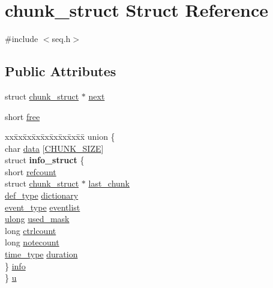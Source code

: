 \hypertarget{structchunk__struct}{}\section{chunk\+\_\+struct Struct Reference}
\label{structchunk__struct}


{\ttfamily \#include $<$seq.\+h$>$}

\subsection*{Public Attributes}
\begin{DoxyCompactItemize}
\item 
struct \hyperlink{structchunk__struct}{chunk\+\_\+struct} $\ast$ \hyperlink{structchunk__struct_a7cb05782775004328fdfa5f6846bfed9}{next}
\item 
short \hyperlink{structchunk__struct_a040378291dd24f6c361a846e7ad542ab}{free}
\item 
\begin{tabbing}
xx\=xx\=xx\=xx\=xx\=xx\=xx\=xx\=xx\=\kill
union \{\\
\>char \hyperlink{structchunk__struct_afd1e82a4b95631fc0bf56c308d017314}{data} \mbox{[}\hyperlink{seq_8h_aea3cfda4f3a9f978ec759f206cf186fe}{CHUNK\_SIZE}\mbox{]}\\
\>struct {\bfseries info\_struct} \{\\
\>\>short \hyperlink{structchunk__struct_a4163a53b7a225fb5f9e3f9563cc650d3}{refcount}\\
\>\>struct \hyperlink{structchunk__struct}{chunk\_struct} $\ast$ \hyperlink{structchunk__struct_a962fec9809069227f1725c0b3e45243e}{last\_chunk}\\
\>\>\hyperlink{seq_8h_ad79cae95b060411f66c9ac96cb3237a4}{def\_type} \hyperlink{structchunk__struct_a39028f92d8e102ad269319a1fb6dc17c}{dictionary}\\
\>\>\hyperlink{seq_8h_af6509ba8f4584d40a046340b73d2bd15}{event\_type} \hyperlink{structchunk__struct_a50449feec0417c81c43a7ba9b0a042e4}{eventlist}\\
\>\>\hyperlink{_s_t_types_8h_a718b4eb2652c286f4d42dc18a8e71a1a}{ulong} \hyperlink{structchunk__struct_a41ec36034919a83150bbeefecbbd4a97}{used\_mask}\\
\>\>long \hyperlink{structchunk__struct_a0f00a7b0d9ebb763434e97b755df1275}{ctrlcount}\\
\>\>long \hyperlink{structchunk__struct_ae61e516279de8801dc94b743370b0b61}{notecount}\\
\>\>\hyperlink{midifns_8h_a3f787491db5dbc75c21b27d54e9ebae6}{time\_type} \hyperlink{structchunk__struct_a0b3c45f65bd02dedda508f30613216b2}{duration}\\
\>\} \hyperlink{structchunk__struct_af8fb106d83da76450d173cf81b424004}{info}\\
\} \hyperlink{structchunk__struct_a935f634166838e9a1f9059a06cc671c4}{u}\\

\end{tabbing}\end{DoxyCompactItemize}


